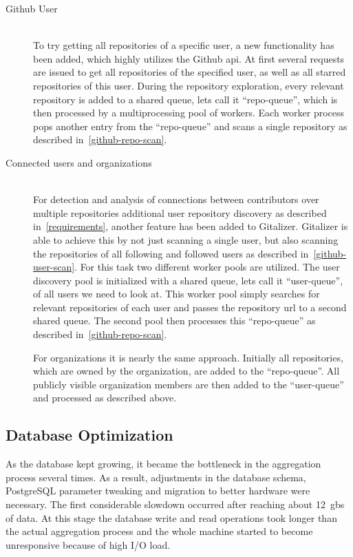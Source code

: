 \begin{description}
    \item[Github User]\label{github-repo-scan} \hfill \\
        To try getting all repositories of a specific user, a new functionality has been added, which highly utilizes the Github \ac{api}.
        At first several requests are issued to get all repositories of the specified user, as well as all starred repositories of this user.
        During the repository exploration, every relevant repository is added to a shared queue, lets call it ``repo-queue'', which is then processed by a multiprocessing pool of workers.
        Each worker process pops another entry from the ``repo-queue'' and scans a single repository as described in~\ref{github-repo-scan}.


    \item[Connected users and organizations]\label{github-repo-scan} \hfill \\
        For detection and analysis of connections between contributors over multiple repositories additional user repository discovery as described in~\ref{requirements}, another feature has been added to Gitalizer.
        Gitalizer is able to achieve this by not just scanning a single user, but also scanning the repositories of all following and followed users as described in~\ref{github-user-scan}.
        For this task two different worker pools are utilized.
        The user discovery pool is initialized with a shared queue, lets call it ``user-queue'', of all users we need to look at.
        This worker pool simply searches for relevant repositories of each user and passes the repository \ac{url} to a second shared queue.
        The second pool then processes this ``repo-queue'' as described in~\ref{github-repo-scan}.

        For organizations it is nearly the same approach.
        Initially all repositories, which are owned by the organization, are added to the ``repo-queue''.
        All publicly visible organization members are then added to the ``user-queue'' and processed as described above.
\end{description}


\subsection{Database Optimization}
As the database kept growing, it became the bottleneck in the aggregation process several times.
As a result, adjustments in the database schema, PostgreSQL parameter tweaking and migration to better hardware were necessary.
The first considerable slowdown occurred after reaching about 12~\acp{gb} of data.
At this stage the database write and read operations took longer than the actual aggregation process and the whole machine started to become unresponsive because of high I/O load.

